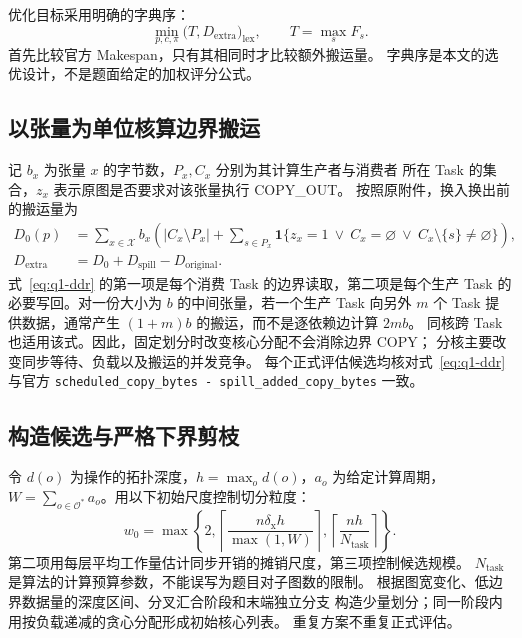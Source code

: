 优化目标采用明确的字典序：
\begin{equation}
 \min_{p,c,\pi}\bigl(T,D_{\mathrm{extra}}\bigr)_{\mathrm{lex}},
 \qquad T=\max_s F_s .
 \label{eq:q1-objective}
\end{equation}
首先比较官方 Makespan，只有其相同时才比较额外搬运量。
字典序是本文的选优设计，不是题面给定的加权评分公式。

\subsection{以张量为单位核算边界搬运}
记 $b_x$ 为张量 $x$ 的字节数，$P_x,C_x$ 分别为其计算生产者与消费者
所在 Task 的集合，$z_x$ 表示原图是否要求对该张量执行 COPY\_OUT。
按照原附件，换入换出前的搬运量为
\begin{align}
 D_0(p)&=\sum_{x\in\mathcal X}b_x\left(
 |C_x\setminus P_x|+
 \sum_{s\in P_x}\mathbf 1\{z_x=1\ \lor\ C_x=\varnothing\ \lor\ C_x\setminus\{s\}\ne\varnothing\}
 \right), \label{eq:q1-ddr}\\
 D_{\mathrm{extra}}&=D_0+D_{\mathrm{spill}}-D_{\mathrm{original}}.
 \label{eq:q1-extra}
\end{align}
式~\eqref{eq:q1-ddr} 的第一项是每个消费 Task 的边界读取，第二项是每个生产
Task 的必要写回。对一份大小为 $b$ 的中间张量，若一个生产 Task 向另外
$m$ 个 Task 提供数据，通常产生 $(1+m)b$ 的搬运，而不是逐依赖边计算 $2mb$。
同核跨 Task 也适用该式。因此，固定划分时改变核心分配不会消除边界 COPY；
分核主要改变同步等待、负载以及搬运的并发竞争。
每个正式评估候选均核对式~\eqref{eq:q1-ddr} 与官方
\texttt{scheduled\_copy\_bytes - spill\_added\_copy\_bytes} 一致。

\subsection{构造候选与严格下界剪枝}
令 $d(o)$ 为操作的拓扑深度，$h=\max_o d(o)$，$a_o$ 为给定计算周期，
$W=\sum_{o\in\mathcal O^*}a_o$。用以下初始尺度控制切分粒度：
\begin{equation}
 w_0=\max\left\{2,
 \left\lceil\frac{n\delta_{\mathrm{x}}h}{\max(1,W)}\right\rceil,
 \left\lceil\frac{nh}{N_{\mathrm{task}}}\right\rceil\right\}.
 \label{eq:q1-width}
\end{equation}
第二项用每层平均工作量估计同步开销的摊销尺度，第三项控制候选规模。
$N_{\mathrm{task}}$ 是算法的计算预算参数，不能误写为题目对子图数的限制。
根据图宽变化、低边界数据量的深度区间、分叉汇合阶段和末端独立分支
构造少量划分；同一阶段内用按负载递减的贪心分配形成初始核心列表。
重复方案不重复正式评估。


